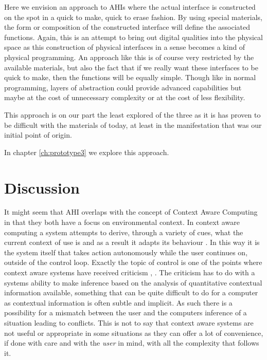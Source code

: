 Here we envision an approach to AHIs where the actual interface is constructed on the spot in a quick to make, quick to erase fashion.
By using special materials, the form or composition of the constructed interface will define the associated functions.
Again, this is an attempt to bring out digital qualities into the physical space as this construction of physical interfaces in a sense becomes a kind of physical programming.
An approach like this is of course very restricted by the available materials, but also the fact that if we really want these interfaces to be quick to make, then the functions will be equally simple.
Though like in normal programming, layers of abstraction could provide advanced capabilities but maybe at the cost of unnecessary complexity or at the cost of less flexibility.

This approach is on our part the least explored of the three as it is has proven to be difficult with the materials of today, at least in the manifestation that was our initial point of origin. 

In chapter \ref{ch:prototype3} we explore this approach.

\section{Discussion} 

It might seem that AHI overlaps with the concept of Context Aware Computing in that they both have a focus on environmental context.
In context aware computing a system attempts to derive, through a variety of cues, what the current context of use is and as a result it adapts its behaviour \citep[chap. 8]{krumm2009ubiquitous}. 
In this way it is the system itself that takes action autonomously while the user continues on, outside of the control loop.
Exactly the topic of control is one of the points where context aware systems have received criticism \cite{erickson2002some}, \citep[chap. 8]{krumm2009ubiquitous}.
The criticism has to do with a systems ability to make inference based on the analysis of quantitative contextual information available, something that can be quite difficult to do for a computer as contextual information is often subtle and implicit.
As such there is a possibility for a mismatch between the user and the computers inference of a situation leading to conflicts.
This is not to say that context aware systems are not useful or appropriate in some situations as they can offer a lot of convenience, if done with care and with the \emph{user} in mind, with all the complexity that follows it.

